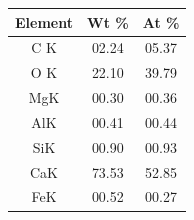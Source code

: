 \begin{minipage}{\textwidth}
\begin{minipage}[b]{0.32\textwidth}
\begin{tabular}{|c|c|c|}
      Element & Wt \%  & At \%  \\ \hline
      C K     & 02.24 & 05.37 \\ \hline
      O K     & 22.10 & 39.79 \\ \hline
      MgK     & 00.30 & 00.36 \\ \hline
      AlK     & 00.41 & 00.44 \\ \hline
      SiK     & 00.90 & 00.93 \\ \hline
      CaK     & 73.53 & 52.85 \\ \hline
      FeK     & 00.52 & 00.27 \\ \hline
      \end{tabular}
    \label{tab:00-05}
  \end{minipage}
\end{minipage}


